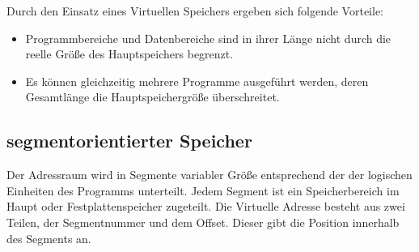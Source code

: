 \documentclass[12pt,a4paper]{article}
\begin{document}
\noindent Durch den Einsatz eines Virtuellen Speichers ergeben sich folgende Vorteile:
\begin{itemize}
\item Programmbereiche und Datenbereiche sind in ihrer Länge nicht durch die reelle Größe des Hauptspeichers begrenzt.
\item Es können gleichzeitig mehrere Programme ausgeführt werden, deren Gesamtlänge die Hauptspeichergröße überschreitet.
\end{itemize}
\subsection{segmentorientierter Speicher}
\noindent Der Adressraum wird in Segmente variabler Größe entsprechend der der logischen Einheiten des Programms unterteilt. Jedem Segment ist ein Speicherbereich im Haupt oder Festplattenspeicher zugeteilt. Die Virtuelle Adresse besteht aus zwei Teilen, der Segmentnummer und dem Offset. Dieser gibt die Position innerhalb des Segments an.
\end{document}
